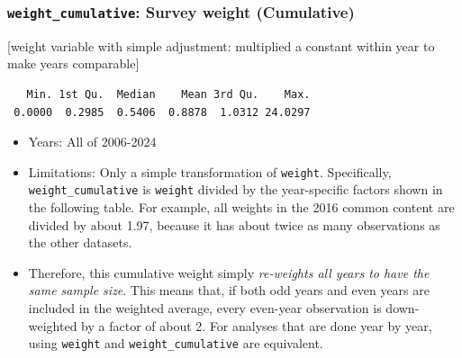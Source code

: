 \documentclass[10pt,article,oneside]{memoir}
\begin{document}
\subsubsection{\texorpdfstring{\texttt{weight\_cumulative}: Survey
weight
(Cumulative)}{weight\_cumulative: Survey weight (Cumulative)}}\label{weight_cumulative-survey-weight-cumulative}

{[}weight variable with simple adjustment: multiplied a constant within
year to make years comparable{]}

\begin{verbatim}
   Min. 1st Qu.  Median    Mean 3rd Qu.    Max. 
 0.0000  0.2985  0.5406  0.8878  1.0312 24.0297 
\end{verbatim}

\begin{itemize}
\tightlist
\item
  Years: All of 2006-2024
\item
  Limitations: Only a simple transformation of \texttt{weight}.
  Specifically, \texttt{weight\_cumulative} is \texttt{weight} divided
  by the year-specific factors shown in the following table. For
  example, all weights in the 2016 common content are divided by about
  1.97, because it has about twice as many observations as the other
  datasets.
\item
  Therefore, this cumulative weight simply \emph{re-weights all years to
  have the same sample size}. This means that, if both odd years and
  even years are included in the weighted average, every even-year
  observation is down-weighted by a factor of about 2. For analyses that
  are done year by year, using \texttt{weight} and
  \texttt{weight\_cumulative} are equivalent.
\end{itemize}
\end{document}
